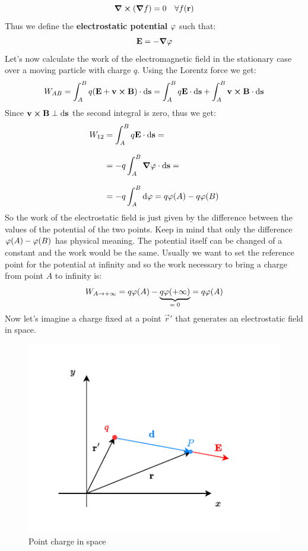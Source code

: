 \begin{equation}
  \curl{(\grad{f})} = 0 \quad \forall f(\vb{r})
\end{equation}
Thus we define the \textbf{electrostatic potential} $\varphi$ such that:
\begin{equation}
  \vb{E} = -\grad{\varphi}
\end{equation}
Let's now calculate the work of the electromagnetic field in the stationary case over a moving particle with charge $q$. Using the Lorentz force we get:
\begin{equation}
  W_{AB} = \int_{A}^{B} q (\vb{E} + \vb{v} \cross \vb{B}) \cdot \dd{\vb{s}} = \int_{A}^{B} q \vb{E} \cdot \dd{\vb{s}} + \int_{A}^{B} \vb{v} \cross \vb{B} \cdot \dd{\vb{s}}
\end{equation}
Since $\vb{v} \cross \vb{B} \perp \dd{\vb{s}}$ the second integral is zero, thus we get:
\begin{equation}
  \begin{split}
    W_{12} &= \int_{A}^{B} q \vb{E} \cdot \dd{\vb{s}} =\\[8pt]
    &= -q \int_{A}^{B} \grad{\varphi} \cdot \dd{\vb{s}} =\\[8pt]
    &= -q \int_{A}^{B} \dd{\varphi} = q\varphi(A) - q\varphi(B)
  \end{split}
\end{equation}
So the work of the electrostatic field is just given by the difference between the values of the potential of the two points. Keep in mind that only the difference $\varphi(A) - \varphi(B)$ has physical meaning. The potential itself can be changed of a constant and the work would be the same. Usually we want to set the reference point for the potential at infinity and so the work necessary to bring a charge from point $A$ to infinity is:
\begin{equation}
  W_{A\rightarrow +\infty} = q\varphi(A) - \underbrace{q\varphi(+\infty)}_{=\;0} = q\varphi(A)
\end{equation}
Now let's imagine a charge fixed at a point $\vec{r}'$ that generates an electrostatic field in space.
\begin{figure}[H]
  \centering
  \includegraphics[width=0.7\linewidth]{res/svg/point_charge.drawio}
  \caption{Point charge in space}
\end{figure}
